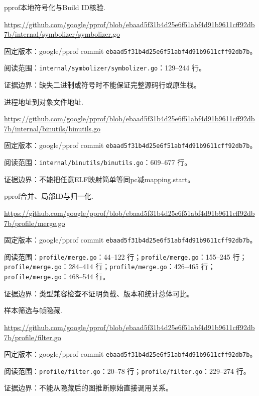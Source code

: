 \documentclass[UTF8,fontset=fandol,openany,11pt]{ctexbook}
\begin{document}
\begin{thebibliography}{999}
 pprof本地符号化与Build ID核验.\par
\url{https://github.com/google/pprof/blob/ebaad5f31b4d25e6f51abf4d91b9611cff92db7b/internal/symbolizer/symbolizer.go}\par
{\small\raggedright 固定版本：google/pprof commit \texttt{ebaad5f3\allowbreak{}1b4d25e6\allowbreak{}f51abf4d\allowbreak{}91b9611c\allowbreak{}ff92db7b}。\par
阅读范围：\nolinkurl{internal/symbolizer/symbolizer.go}：129–244 行。\par
证据边界：缺失二进制或符号时不能保证完整源码行或原生栈。
}

 进程地址到对象文件地址.\par
\url{https://github.com/google/pprof/blob/ebaad5f31b4d25e6f51abf4d91b9611cff92db7b/internal/binutils/binutils.go}\par
{\small\raggedright 固定版本：google/pprof commit \texttt{ebaad5f3\allowbreak{}1b4d25e6\allowbreak{}f51abf4d\allowbreak{}91b9611c\allowbreak{}ff92db7b}。\par
阅读范围：\nolinkurl{internal/binutils/binutils.go}：609–677 行。\par
证据边界：不能把任意ELF映射简单等同pc减mapping.start。
}

 pprof合并、局部ID与归一化.\par
\url{https://github.com/google/pprof/blob/ebaad5f31b4d25e6f51abf4d91b9611cff92db7b/profile/merge.go}\par
{\small\raggedright 固定版本：google/pprof commit \texttt{ebaad5f3\allowbreak{}1b4d25e6\allowbreak{}f51abf4d\allowbreak{}91b9611c\allowbreak{}ff92db7b}。\par
阅读范围：\nolinkurl{profile/merge.go}：44–122 行；\nolinkurl{profile/merge.go}：155–245 行；\nolinkurl{profile/merge.go}：284–414 行；\nolinkurl{profile/merge.go}：426–465 行；\nolinkurl{profile/merge.go}：468–544 行。\par
证据边界：类型兼容检查不证明负载、版本和统计总体可比。
}

 样本筛选与帧隐藏.\par
\url{https://github.com/google/pprof/blob/ebaad5f31b4d25e6f51abf4d91b9611cff92db7b/profile/filter.go}\par
{\small\raggedright 固定版本：google/pprof commit \texttt{ebaad5f3\allowbreak{}1b4d25e6\allowbreak{}f51abf4d\allowbreak{}91b9611c\allowbreak{}ff92db7b}。\par
阅读范围：\nolinkurl{profile/filter.go}：20–78 行；\nolinkurl{profile/filter.go}：229–274 行。\par
证据边界：不能从隐藏后的图推断原始直接调用关系。
}


\end{thebibliography}
\end{document}
